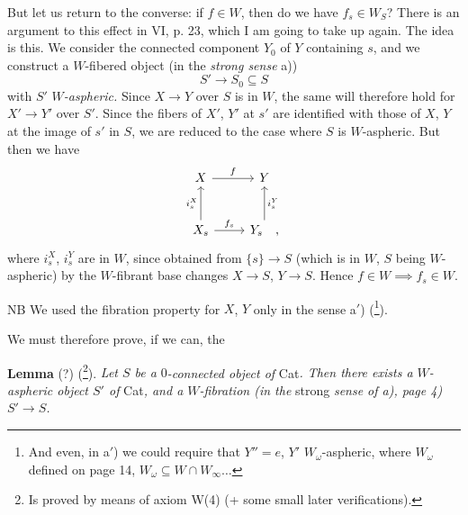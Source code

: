 But let us return to the converse: if $f \in W$, then do we have $f_s \in W_S$? There is an argument to this effect in VI, p. 23, which I am going to take up again. The idea is this. We consider the connected component $Y_0$ of $Y$ containing $s$, and we construct a
$W$-fibered object (in the \textit{strong sense} a))
\[ S' \longrightarrow S_0 \subseteq S \]
with $S'$ \textit{$W$-aspheric.} Since $X \longrightarrow Y$ over $S$ is in $W$, the same will therefore hold for $X' \longrightarrow Y'$ over $S'$. Since the fibers of $X'$, $Y'$ at $s'$ are identified with those of $X$, $Y$ at the image of $s'$ in $S$, we are reduced to the case where $S$ is $W$-aspheric. But then we have
\[
\begin{tikzcd}[row sep=large]
X \arrow[r, "f"] & Y \\
X_s \arrow[u, "i_s^X"] \arrow[r, "f_s"] & Y_s \arrow[u, "i_s^Y"'] \quad ,
\end{tikzcd}
\]
where $i_s^X$, $i_s^Y$ are in $W$, since obtained from $\{s\} \longrightarrow S$ (which is in $W$, $S$ being $W$-aspheric) by the $W$-fibrant base changes $X \longrightarrow S$, $Y \longrightarrow S$. Hence $f \in W \implies f_s \in W$.

NB We used the fibration property for $X$, $Y$ only in the sense a$'$) (\footnote[10]{And even, in a$'$) we could require that $Y'' = e$, $Y'$ $W_\omega$-aspheric, where $W_\omega$ defined on page 14, $W_\omega \subseteq W \cap W_\infty \ldots$}).

We must therefore prove, if we can, the

\textbf{Lemma} (?) (\footnote[11]{Is proved by means of axiom W(4) (+ some small later verifications).}). \textit{Let $S$ be a} $0$\textit{-connected object of} Cat\textit{. Then there exists a $W$-aspheric object $S'$ of} Cat\textit{, and a $W$-fibration (in the} strong \textit{sense of a), page 4) $S' \longrightarrow S$.}

